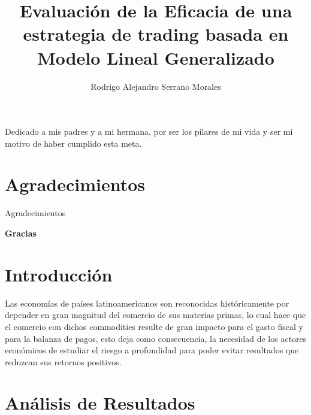 \documentclass[a4paper,12pt]{Latex/Classes/PhDthesisPSnPDF}
\title{Evaluación de la Eficacia de una estrategia de trading basada en Modelo Lineal Generalizado}
\author{Rodrigo Alejandro Serrano Morales}
\begin{document}


\maketitle									%

\newpage\renewcommand{\thepage}{\arabic{page}}\setcounter{page}{1} 


\begin{dedication}
Dedicado a mis padres y a mi hermana, por ser los pilares de mi vida y ser mi motivo de haber cumplido esta meta.
\end{dedication}
\newpage
\chapter*{Agradecimientos}

Agradecimientos




  \begin{flushright}
  \textbf{Gracias}
  \end{flushright}

\tableofcontents
\listoffigures
\listoftables



\chapter*{Introducción}

Las economías de países latinoamericanos son reconocidas históricamente por depender en gran magnitud del comercio de sus materias primas, lo cual hace que el comercio con dichos commodities resulte de gran impacto para el gasto fiscal y para la balanza de pagos, esto deja como consecuencia, la necesidad de los actores económicos de estudiar el riesgo a profundidad para poder evitar resultados que reduzcan sus retornos positivos.\\ 


\chapter{Análisis de Resultados}
\end{document}
